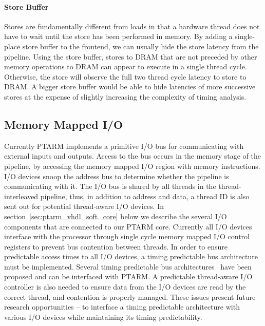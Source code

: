 \paragraph{Store Buffer}
\label{sec:ptarm_dram_store_buffer}
Stores are fundamentally different from loads in that a hardware thread does not have to wait until the store has been performed in memory.
By adding a single-place store buffer to the frontend, we can usually hide the store latency from the pipeline.
Using the store buffer, stores to DRAM that are not preceded by other memory operations to DRAM can appear to execute in a single thread cycle.
Otherwise, the store will observe the full two thread cycle latency to store to DRAM.
A bigger store buffer would be able to hide latencies of more successive stores at the expense of slightly increasing the complexity of timing analysis.

\subsection{Memory Mapped I/O}
Currently PTARM implements a primitive I/O bus for communicating with external inputs and outputs.
Access to the bus occurs in the memory stage of the pipeline, by accessing the memory mapped I/O region with memory instructions.
I/O devices snoop the address bus to determine whether the pipeline is communicating with it.
The I/O bus is shared by all threads in the thread-interleaved pipeline, thus, in addition to address and data, a thread ID is also sent out for potential thread-aware I/O devices. 
In section~\ref{sec:ptarm_vhdl_soft_core} below we describe the several I/O components that are connected to our PTARM core.
Currently all I/O devices interface with the processor through single cycle memory mapped I/O control registers to prevent bus contention between threads.
In order to ensure predictable access times to all I/O devices, a timing predictable bus architecture must be implemented.   
Several timing predictable bus architectures~ have been proposed and can be interfaced with PTARM. 
A predictable thread-aware I/O controller is also needed to ensure data from the I/O devices are read by the correct thread, and contention is properly managed.
These issues present future research opportunities -- to interface a timing predictable architecture with various I/O devices while maintaining its timing predictability.  

